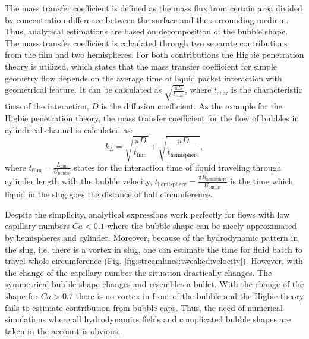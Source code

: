 \documentclass{article}
\newcommand{\beq}{\begin{equation}}
\newcommand{\feq}{\end{equation}}
\newcommand{\lfilm}{L_{\mathrm{film}}}
\newcommand{\ububble}{U_{\mathrm{bubble}}}
\begin{document}
The mass transfer coefficient is defined as the mass flux from certain area divided by concentration difference between the surface and the surrounding medium.  Thus, analytical estimations \cite{kreutzer-overview,irandoust} are  based on decomposition of the bubble shape. The mass transfer coefficient is calculated through two separate contributions from the film and two hemispheres. For both contributions the Higbie penetration theory \cite{higbie} is utilized, which states that the mass transfer coefficient  for simple geometry flow depends on the average time of liquid packet interaction with geometrical feature. It can be calculated as $\sqrt{\frac{\pi D}{t_{\mathrm{char}}}}$, where $t_{\mathrm{char}}$ is the characteristic time of the interaction, $D$ is the diffusion coefficient. As the example for the Higbie penetration theory, the mass  transfer coefficient for the flow of bubbles in cylindrical channel is calculated as:
\beq
k_L=\sqrt{\frac{\pi D}{t_{\mathrm{film}}}}+\sqrt{\frac{\pi D}{t_{\mathrm{hemisphere}}}},
\feq
where $t_{\mathrm{film}}=\frac{\lfilm}{\ububble}$ states for the interaction time of liquid traveling through cylinder length with the bubble velocity, $t_{\mathrm{hemisphere}}=\frac{\pi R_{\mathrm{hemisphere}}}{\ububble}$ is the time which liquid in the slug goes the distance of half circumference. 

Despite the simplicity, analytical expressions work perfectly for flows with low capillary numbers $Ca<0.1$ \cite{bercic-mass} where the bubble shape can be nicely approximated by hemispheres and cylinder. Moreover, because of the hydrodynamic pattern in the slug, i.e. there is a vortex in slug, one can estimate the time for fluid batch to travel whole circumference (Fig. \ref{fig:streamlines:tweaked:velocity}).   However, with the change of the capillary number the situation drastically changes. The symmetrical bubble shape changes and resembles a bullet. With the change of the shape for $Ca>0.7$ there is no vortex in front of the bubble and the Higbie theory fails to estimate contribution from bubble caps. Thus, the need of numerical simulations where all hydrodynamics fields and complicated bubble shapes are taken in the account is obvious. 
\end{document}
